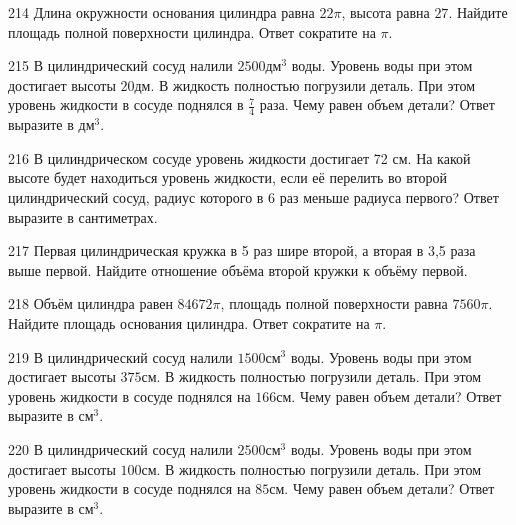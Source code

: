 \documentclass[4apaper]{article}
\begin{document}
\begin{taskBN}{214}
Длина окружности основания цилиндра равна $22\pi$, высота равна $27$. Найдите площадь полной поверхности цилиндра. Ответ сократите на $\pi$.
\end{taskBN}

\begin{taskBN}{215}
В цилиндрический сосуд налили $2500\mbox{дм}^3$ воды. Уровень воды при этом достигает высоты $20$дм. В жидкость полностью погрузили деталь. При этом уровень жидкости в сосуде поднялся в $\frac{7}{4}$ раза. Чему равен объем детали? Ответ выразите в $\mbox{дм}^3$.
\end{taskBN}

\begin{taskBN}{216}
В цилиндрическом сосуде уровень жидкости достигает 72 см. На какой высоте будет находиться уровень жидкости, если её перелить во второй цилиндрический сосуд, радиус которого в 6 раз меньше радиуса первого? Ответ выразите в сантиметрах.
\end{taskBN}

\begin{taskBN}{217}
 Первая цилиндрическая кружка в 5 раз шире второй, а вторая в 3,5 раза выше первой. Найдите отношение объёма второй кружки к объёму первой.
\end{taskBN}

\begin{taskBN}{218}
Объём цилиндра равен $84672\pi$, площадь полной поверхности равна $7560\pi$. Найдите площадь основания цилиндра. Ответ сократите на $\pi$.
\end{taskBN}

\begin{taskBN}{219}
В цилиндрический сосуд налили $1500\mbox{см}^3$ воды. Уровень воды при этом достигает высоты $375$см. В жидкость полностью погрузили деталь. При этом уровень жидкости в сосуде поднялся на $166$см. Чему равен объем детали? Ответ выразите в $\mbox{см}^3$.
\end{taskBN}

\begin{taskBN}{220}
В цилиндрический сосуд налили $2500\mbox{см}^3$ воды. Уровень воды при этом достигает высоты $100$см. В жидкость полностью погрузили деталь. При этом уровень жидкости в сосуде поднялся на $85$см. Чему равен объем детали? Ответ выразите в $\mbox{см}^3$.
\end{taskBN}
\end{document}
